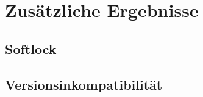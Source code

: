 

\section{Zusätzliche Ergebnisse}



\subsection{Softlock}




\subsection{Versionsinkompatibilität}
